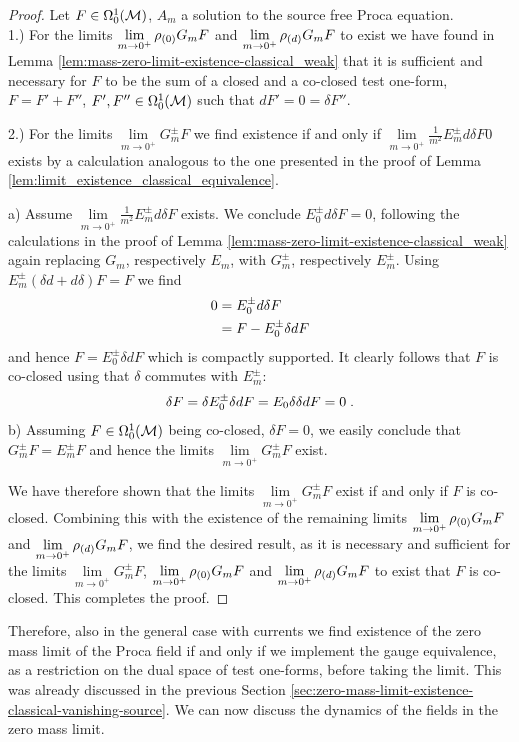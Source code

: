 \begin{proof}
Let $F \in \Omega^1_0(\mathcal{M})$, $A_m$ a solution to the source free Proca equation. \\
1.)  For the limits $\lim\limits_{m \to 0^+} \rho_{(0)} G_m F$ and  $\lim\limits_{m \to 0^+} \rho_{(d)} G_m F$ to exist we have found in Lemma \ref{lem:mass-zero-limit-existence-classical_weak} that it is sufficient and necessary for $F$ to be the sum of a closed and a co-closed test one-form, $F = F' + F''$, $F',F'' \in \Omega^1_0(\mathcal{M})$ such that $dF' = 0 = \delta F''$. \par
%
2.) For the limits $\lim\limits_{m \to 0^+} G_m^\pm F$ we find existence if and only if $\lim\limits_{m \to 0^+} \frac{1}{m^2}E_m^\pm d \delta F0$ exists by a calculation analogous to the one presented in the proof of Lemma \ref{lem:limit_existence_classical_equivalence}.\par
a) Assume $\lim\limits_{m \to 0^+} \frac{1}{m^2}E_m^\pm d \delta F$ exists. We conclude $E_0^\pm d \delta F = 0$, following the calculations in the proof of Lemma \ref{lem:mass-zero-limit-existence-classical_weak} again replacing $G_m$, respectively $E_m$, with $G_m^\pm$, respectively $E_m^\pm$. Using $E_m^\pm (\delta d + d \delta )F = F$ we find
\begin{align}
	0
	&=  E_0^\pm d \delta F  \notag\\
	&= F - E_0^\pm \delta d F
\end{align}
and hence $F = E_0^\pm \delta d F$ which is compactly supported. It clearly follows that $F$ is co-closed using that $\delta$ commutes with $E_m^\pm$:
\begin{align}
	\delta F = \delta E_0^\pm \delta d F = E_0 \delta \delta d F = 0 \;.
\end{align}
b) Assuming $F \in \Omega^1_0(\mathcal{M})$ being co-closed, $\delta F = 0$, we easily conclude that $G^\pm_m F = E^\pm_m F$ and hence the limits $\lim\limits_{m \to 0^+} G_m^\pm F$ exist. \par
%
We have therefore shown that the limits $\lim\limits_{m \to 0^+} G_m^\pm F$ exist if and only if $F$ is co-closed. Combining this with the existence of the remaining limits $\lim\limits_{m \to 0^+} \rho_{(0)} G_m F$ and  $\lim\limits_{m \to 0^+} \rho_{(d)} G_m F$, we find the desired result, as it is necessary and sufficient for the limits $\lim\limits_{m \to 0^+} G_m^\pm F$, $\lim\limits_{m \to 0^+} \rho_{(0)} G_m F$ and  $\lim\limits_{m \to 0^+} \rho_{(d)} G_m F$ to exist that $F$ is co-closed. This completes the proof.
\end{proof}
Therefore, also in the general case with currents we find existence of the zero mass limit of the Proca field if and only if we implement the gauge equivalence, as a restriction on the dual space of test one-forms, before taking the limit. This was already discussed in the previous Section \ref{sec:zero-mass-limit-existence-classical-vanishing-source}. We can now discuss the dynamics of the fields in the zero mass limit.
%
%
%
%
%
%
%
%
%
%
%
%
%
